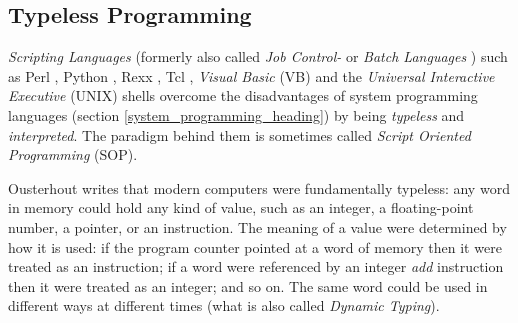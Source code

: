 %
%
%
%
%
%
%

\subsection{Typeless Programming}
\label{typeless_programming_heading}

\emph{Scripting Languages} (formerly also called \emph{Job Control-} or
\emph{Batch Languages} \cite{wikipedia}) such as Perl \cite{wall}, Python
\cite{lutz}, Rexx \cite{ohara}, Tcl \cite{ousterhout1994}, \emph{Visual Basic}
(VB) and the \emph{Universal Interactive Executive} (UNIX) shells overcome the
disadvantages of system programming languages (section
\ref{system_programming_heading}) by being \emph{typeless} and
\emph{interpreted}. The paradigm behind them is sometimes called
\emph{Script Oriented Programming} (SOP).

Ousterhout \cite{ousterhout1998} writes that modern computers were fundamentally
typeless: any word in memory could hold any kind of value, such as an integer, a
floating-point number, a pointer, or an instruction. The meaning of a value were
determined by how it is used: if the program counter pointed at a word of memory
then it were treated as an instruction; if a word were referenced by an integer
\emph{add} instruction then it were treated as an integer; and so on. The same
word could be used in different ways at different times (what is also called
\emph{Dynamic Typing}).

